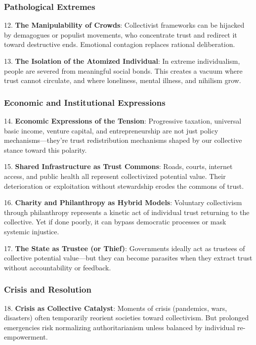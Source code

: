 \documentclass[11pt,oneside]{book}
\begin{document}
\subsubsection{Pathological Extremes}


12. \textbf{The Manipulability of Crowds}: Collectivist frameworks can be hijacked by demagogues or populist movements, who concentrate trust and redirect it toward destructive ends. Emotional contagion replaces rational deliberation.



13. \textbf{The Isolation of the Atomized Individual}: In extreme individualism, people are severed from meaningful social bonds. This creates a vacuum where trust cannot circulate, and where loneliness, mental illness, and nihilism grow.


\subsubsection{Economic and Institutional Expressions}


14. \textbf{Economic Expressions of the Tension}: Progressive taxation, universal basic income, venture capital, and entrepreneurship are not just policy mechanisms—they're trust redistribution mechanisms shaped by our collective stance toward this polarity.



15. \textbf{Shared Infrastructure as Trust Commons}: Roads, courts, internet access, and public health all represent collectivized potential value. Their deterioration or exploitation without stewardship erodes the commons of trust.



16. \textbf{Charity and Philanthropy as Hybrid Models}: Voluntary collectivism through philanthropy represents a kinetic act of individual trust returning to the collective. Yet if done poorly, it can bypass democratic processes or mask systemic injustice.



17. \textbf{The State as Trustee (or Thief)}: Governments ideally act as trustees of collective potential value—but they can become parasites when they extract trust without accountability or feedback.


\subsubsection{Crisis and Resolution}


18. \textbf{Crisis as Collective Catalyst}: Moments of crisis (pandemics, wars, disasters) often temporarily reorient societies toward collectivism. But prolonged emergencies risk normalizing authoritarianism unless balanced by individual re-empowerment.
\end{document}
